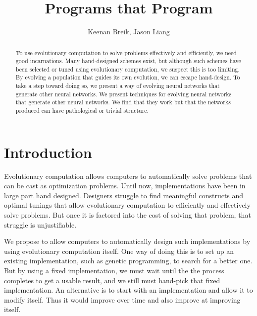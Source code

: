\documentclass[12pt]{article}
\begin{document}
\title{Programs that Program}

\author{Keenan Breik, Jason Liang}
\date{}
\maketitle

\begin{abstract}
To use evolutionary computation
to solve problems effectively and efficiently,
we need good incarnations.
Many hand-designed schemes exist,
but although such schemes have been selected or tuned
using evolutionary computation,
we suspect this is too limiting.
By evolving a population
that guides its own evolution,
we can escape hand-design.
To take a step toward doing so,
we present a way of evolving neural networks
that generate other neural networks.
We present techniques for evolving
neural networks that generate other neural networks.
We find that they work
but that the networks produced
can have pathological or trivial structure.
\end{abstract}

\section{Introduction}
\label{intro}

Evolutionary computation allows computers
to automatically solve problems
that can be cast as optimization problems.
Until now, implementations have been
in large part hand designed.
Designers struggle to find meaningful constructs
and optimal tunings that allow evolutionary computation
to efficiently and effectively solve problems.
But once it is factored into the cost
of solving that problem,
that struggle is unjustifiable.

We propose to allow computers
to automatically design such implementations
by using evolutionary computation itself.
One way of doing this is to set up
an existing implementation,
such as genetic programming,
to search for a better one.
But by using a fixed implementation,
we must wait until the the process completes
to get a usable result,
and we still must hand-pick that fixed implementation.
An alternative is to start with an implementation
and allow it to modify itself.
Thus it would improve over time
and also improve at improving itself.
\end{document}
